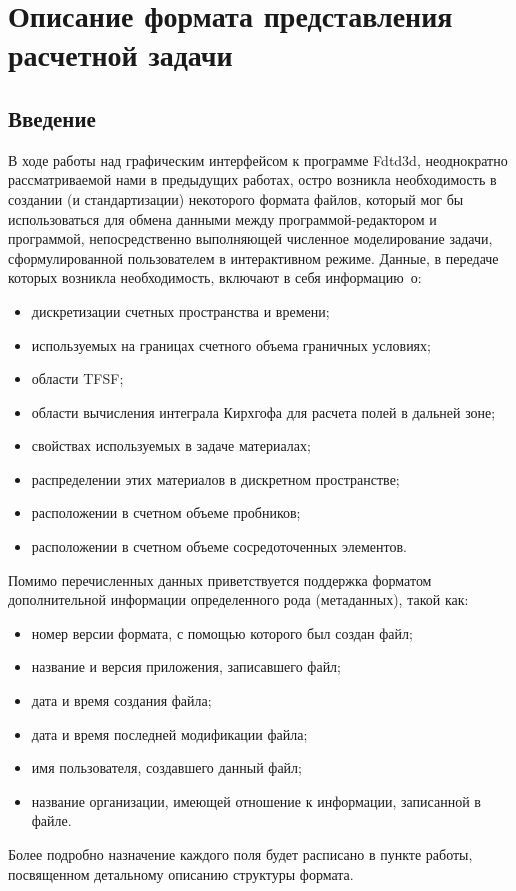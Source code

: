 
\section{Описание формата представления расчетной задачи}
\label{div:FileFormat}

\subsection{Введение}

В ходе работы над графическим интерфейсом к программе Fdtd3d, неоднократно
рассматриваемой нами в предыдущих работах, остро возникла необходимость
в создании (и стандартизации) некоторого формата файлов, который мог бы
использоваться для обмена данными между программой-редактором и программой,
непосредственно выполняющей численное моделирование задачи, сформулированной
пользователем в интерактивном режиме. Данные, в передаче которых возникла
необходимость, включают в себя информацию~о:
\begin{itemize}
\item дискретизации счетных пространства и времени;
\item используемых на границах счетного объема граничных условиях;
\item области TFSF;
\item области вычисления интеграла Кирхгофа для расчета полей в дальней зоне;
\item свойствах используемых в задаче материалах;
\item распределении этих материалов в дискретном пространстве;
\item расположении в счетном объеме пробников;
\item расположении в счетном объеме сосредоточенных элементов.
\end{itemize}

Помимо перечисленных данных приветствуется поддержка форматом дополнительной
информации определенного рода (метаданных), такой как:
\begin{itemize}
\item номер версии формата, с помощью которого был создан файл;
\item название и версия приложения, записавшего файл;
\item дата и время создания файла;
\item дата и время последней модификации файла;
\item имя пользователя, создавшего данный файл;
\item название организации, имеющей отношение к информации, записанной в файле.
\end{itemize}
Более подробно назначение каждого поля будет расписано в пункте работы,
посвященном детальному описанию структуры формата.

